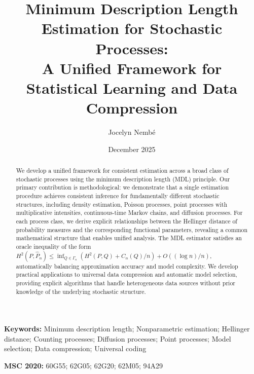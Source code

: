 \documentclass[preprint,review,12pt]{article}
\begin{document}
	
	\title{Minimum Description Length Estimation for Stochastic Processes: \\
		A Unified Framework for Statistical Learning and Data Compression}
	
	\author[1,2]{Jocelyn Nembé}
	
	\date{December 2025}
	
	\maketitle
	
	\begin{abstract}
		We develop a unified framework for consistent estimation across a broad class 
		of stochastic processes using the minimum description length (MDL) principle. 
		Our primary contribution is methodological: we demonstrate that a single 
		estimation procedure achieves consistent inference for fundamentally different 
		stochastic structures, including density estimation, Poisson processes, point 
		processes with multiplicative intensities, continuous-time Markov chains, and 
		diffusion processes. For each process class, we derive explicit relationships 
		between the Hellinger distance of probability measures and the corresponding 
		functional parameters, revealing a common mathematical structure that enables 
		unified analysis. The MDL estimator satisfies an oracle inequality of the form 
		$H^2(P, \hat{P}_n) \leq \inf_{Q \in \Gamma_n}(H^2(P,Q) + C_n(Q)/n) + O((\log n)/n)$,
		automatically balancing approximation accuracy and model complexity. We develop 
		practical applications to universal data compression and automatic model 
		selection, providing explicit algorithms that handle heterogeneous data sources 
		without prior knowledge of the underlying stochastic structure.
	\end{abstract}
	
	\noindent\textbf{Keywords:} Minimum description length; Nonparametric estimation; 
	Hellinger distance; Counting processes; Diffusion processes; Point processes; 
	Model selection; Data compression; Universal coding
	
	\noindent\textbf{MSC 2020:} 60G55; 62G05; 62G20; 62M05; 94A29
	
\end{document}
